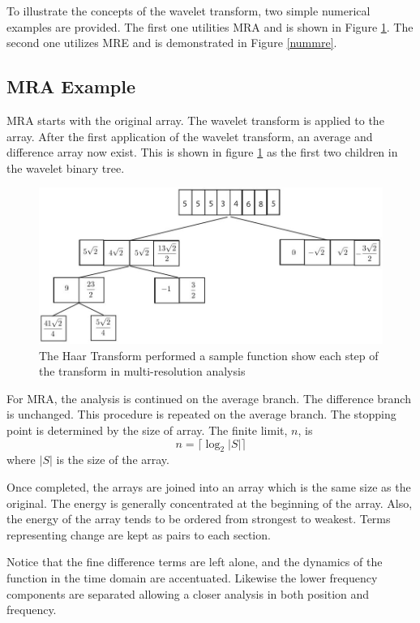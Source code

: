 To illustrate the concepts of the wavelet transform, two simple
numerical examples are provided.  The first one utilities MRA and is
shown in Figure \ref{nummra}. The second one utilizes MRE and is
demonstrated in Figure \ref{nummre}.


\subsection {MRA Example}

MRA starts with the original array.  The wavelet transform is applied to the array.   After the first application of the wavelet transform, an average and difference array now exist.  This is shown in figure \ref{nummra} as the first two children in the wavelet binary tree.

\begin{figure}
\includegraphics [width=6.5in]{mraexample2.jpg}
\caption{The Haar Transform performed a sample function show each step of the transform in multi-resolution analysis }
\label{nummra}
\end{figure}

For MRA, the analysis is continued on the average branch.  The difference branch is unchanged.  This procedure is repeated on the average branch.   The stopping point is determined by the size of array.  The finite limit, $n$, is 
\begin{equation} \label{eqn:treeheight} \displaystyle
n = \lceil\log_2 \left|S\right|\rceil
\end{equation}
where $\left|S\right|$ is the size of the array.

Once completed, the arrays are joined into an array which is the same
size as the original.  The energy is generally concentrated at the
beginning of the array.  Also, the energy of the array tends to be
ordered from strongest to weakest.  Terms representing change are kept
as pairs to each section.

Notice that the fine difference terms are left alone, and the dynamics
of the function in the time domain are accentuated.  Likewise the
lower frequency components are separated allowing a closer analysis in
both position and frequency.


